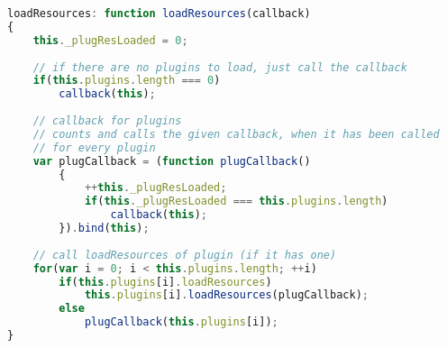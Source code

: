 \begin{lstlisting}[language=JavaScript]
loadResources: function loadResources(callback)
{
	this._plugResLoaded = 0;
	
	// if there are no plugins to load, just call the callback
	if(this.plugins.length === 0)
		callback(this);
	
	// callback for plugins
	// counts and calls the given callback, when it has been called
	// for every plugin
	var plugCallback = (function plugCallback()
		{
			++this._plugResLoaded;
			if(this._plugResLoaded === this.plugins.length)
				callback(this);
		}).bind(this);
	
	// call loadResources of plugin (if it has one)
	for(var i = 0; i < this.plugins.length; ++i)
		if(this.plugins[i].loadResources)
			this.plugins[i].loadResources(plugCallback);
		else
			plugCallback(this.plugins[i]);
}
\end{lstlisting}